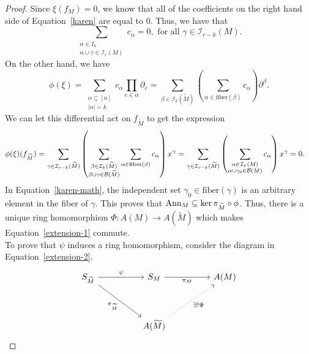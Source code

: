 \documentclass{puthesis-UG}
\begin{document}
\begin{proof}
Since $\xi(f_M) = 0$, we know that all of the coefficients on the right hand side of Equation~\ref{karen} are equal to $0$. Thus, we have that
\[
	\sum_{\substack{\alpha \in I_k \\ \alpha \cup \gamma \in \mathcal{I}_r(M)}} c_\alpha = 0, \text{ for all $\gamma \in \mathcal{I}_{r-k}(M)$}.
\]
On the other hand, we have 
\[
	\phi (\xi) = \sum_{\substack{\alpha \subseteq [n] \\ |\alpha| = k}} c_\alpha \prod_{e \in \alpha} \partial_{\overline{e}} = \sum_{\beta \in \mathcal{I}_{k}(\widetilde{M})} \left ( \sum_{\alpha \in \text{fiber}(\beta)} c_\alpha \right ) \partial^\beta. 
\]
We can let this differential act on $f_{\widetilde{M}}$ to get the expression
\begin{align} \label{karen-math}
	\phi(\xi) (f_{\widetilde{M}}) & = \sum_{\gamma \in \mathcal{I}_{r-k}(\widetilde{M})} \left ( \sum_{\substack{\beta \in \mathcal{I}_k(\widetilde{M}) \\ \beta \cup \gamma \in \mathcal{B}(\widetilde{M})}} \sum_{\alpha \in \text{fiber}(\beta)} c_\alpha \right ) x^\gamma = \sum_{\gamma \in \mathcal{I}_{r-k}(\widetilde{M})} \left ( \sum_{\substack{\alpha \in \mathcal{I}_k(M) \\ \alpha \cup \gamma_0 \in \mathcal{B}(M)}} c_\alpha \right ) x^\gamma = 0.
\end{align}
In Equation~\ref{karen-math}, the independent set $\gamma_0 \in \text{fiber}(\gamma)$ is an arbitrary element in the fiber of $\gamma$. This proves that $\operatorname{Ann}_M \subseteq \ker \pi_{\widetilde{M}} \circ \phi$. Thus, there is a unique ring homomorphism $\Phi : A(M) \to A(\widetilde{M})$ which makes Equation~\ref{extension-1} commute. \\

To prove that $\psi$ induces a ring homomorphism, consider the diagram in Equation~\ref{extension-2}. 
\begin{equation} \label{extension-2}
\begin{tikzcd}
	{S_{\widetilde{M}}} && {S_M} && {A(M)} \\
	\\
	&& {A(\widetilde{M})}
	\arrow["{\pi_{\widetilde{M}}}"', from=1-1, to=3-3]
	\arrow["\psi", from=1-1, to=1-3]
	\arrow["{\pi_M}"', from=1-3, to=1-5]
	\arrow["{\exists! \Psi}"', dotted, from=3-3, to=1-5]
\end{tikzcd}
\end{equation}


\end{proof}
\end{document}
